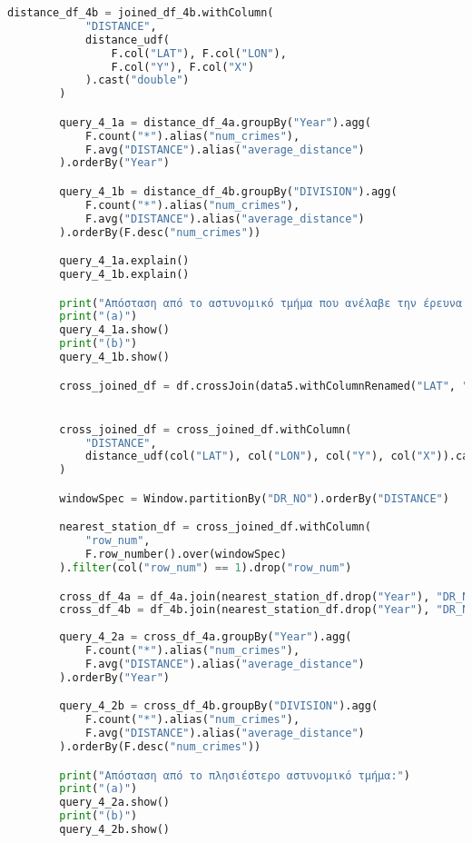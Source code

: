 \documentclass{article}
\begin{document}
\begin{lstlisting}[language = Python]
        distance_df_4b = joined_df_4b.withColumn(
            "DISTANCE",
            distance_udf(
                F.col("LAT"), F.col("LON"),
                F.col("Y"), F.col("X")
            ).cast("double")
        )

        query_4_1a = distance_df_4a.groupBy("Year").agg(
            F.count("*").alias("num_crimes"),
            F.avg("DISTANCE").alias("average_distance")
        ).orderBy("Year")

        query_4_1b = distance_df_4b.groupBy("DIVISION").agg(
            F.count("*").alias("num_crimes"),
            F.avg("DISTANCE").alias("average_distance")
        ).orderBy(F.desc("num_crimes"))

        query_4_1a.explain()
        query_4_1b.explain()

        print("Απόσταση από το αστυνομικό τμήμα που ανέλαβε την έρευνα για το περιστατικό:")
        print("(a)")
        query_4_1a.show()
        print("(b)")
        query_4_1b.show()

        cross_joined_df = df.crossJoin(data5.withColumnRenamed("LAT", "Y").withColumnRenamed("LON", "X"))


        cross_joined_df = cross_joined_df.withColumn(
            "DISTANCE",
            distance_udf(col("LAT"), col("LON"), col("Y"), col("X")).cast("double")
        )

        windowSpec = Window.partitionBy("DR_NO").orderBy("DISTANCE")

        nearest_station_df = cross_joined_df.withColumn(
            "row_num",
            F.row_number().over(windowSpec)
        ).filter(col("row_num") == 1).drop("row_num")

        cross_df_4a = df_4a.join(nearest_station_df.drop("Year"), "DR_NO")
        cross_df_4b = df_4b.join(nearest_station_df.drop("Year"), "DR_NO")
        
        query_4_2a = cross_df_4a.groupBy("Year").agg(
            F.count("*").alias("num_crimes"),
            F.avg("DISTANCE").alias("average_distance")
        ).orderBy("Year")

        query_4_2b = cross_df_4b.groupBy("DIVISION").agg(
            F.count("*").alias("num_crimes"),
            F.avg("DISTANCE").alias("average_distance")
        ).orderBy(F.desc("num_crimes"))

        print("Απόσταση από το πλησιέστερο αστυνομικό τμήμα:")
        print("(a)")
        query_4_2a.show()
        print("(b)")
        query_4_2b.show()

\end{lstlisting}

\end{document}
